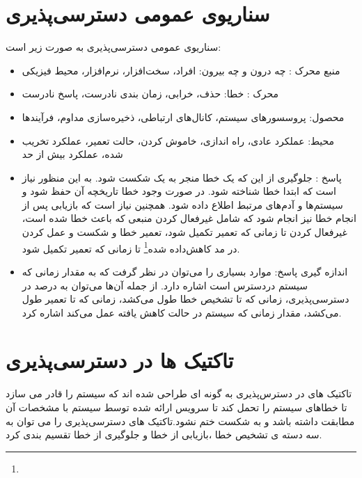\section{سناریوی عمومی دسترسی‌پذیری}
سناریو‌ی عمومی دسترسی‌پذیری به صورت زیر است:
\begin{itemize}
\item
منبع محرک : چه درون و چه بیرون: افراد، سخت‌افزار، نرم‌افزار، محیط فیزیکی 
\item
محرک : خطا: حذف، خرابی، زمان بندی نادرست، پاسخ نادرست
\item
محصول: پروسسورهای سیستم، کانال‌های ارتباطی، ذخیره‌سازی مداوم، فرآیند‌ها
\item
محیط: عملکرد عادی، راه اندازی، خاموش کردن، حالت تعمیر، عملکرد تخریب شده، عملکرد بیش از حد
\item
پاسخ : جلوگیری از این که یک خطا منجر به یک شکست شود. به این منظور نیاز است که ابتدا خطا شناخته شود. در صورت وجود خطا تاریخچه آن حفظ شود و سیستم‌ها و آدم‌های مرتبط اطلاع داده شود. همچنین نیاز است که بازیابی پس از انجام خطا نیز انجام شود که شامل غیرفعال کردن منبعی که باعث خطا شده است، غیرفعال کردن تا زمانی که تعمیر تکمیل شود، تعمیر خطا و شکست و عمل کردن در مد کاهش‌داده شده\footnote{} تا زمانی که تعمیر تکمیل شود.
\item
اندازه گیری پاسخ: موارد بسیاری را می‌توان در نظر گرفت که به مقدار زمانی که سیستم دردسترس است اشاره دارد. از جمله آن‌ها می‌توان به درصد در دسترسی‌پذیری، زمانی که تا تشخیص خطا طول می‌کشد، زمانی که تا تعمیر طول ‌می‌کشد، مقدار زمانی که سیستم در حالت کاهش یافته عمل می‌کند اشاره کرد. 
\end{itemize}

\section{تاکتیک ها در دسترسی‌پذیری}
تاکتیک های در دسترس‌پذیری به گونه ای طراحی شده اند که سیستم را قادر می سازد تا خطاهای سیستم را تحمل کند تا سرویس ارائه شده توسط سیستم با مشخصات آن مطابقت داشته باشد و به شکست ختم نشود.تاکتیک های دسترسی‌پذیری را می توان به سه دسته ی تشخیص خطا ،بازیابی از خطا و جلوگیری از خطا تقسیم بندی کرد.
